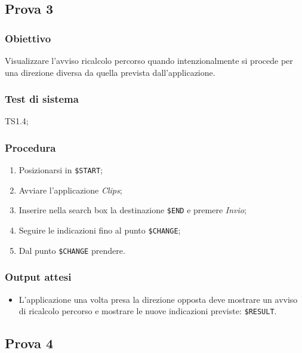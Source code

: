 \documentclass[../Sperimentazione.tex]{subfiles}
\begin{document}
	
	
\newpage
\subsection{Prova 3} %
\label{subsec:Prova3}
	
	\subsubsection{Obiettivo}
		Visualizzare l'avviso ricalcolo percorso quando intenzionalmente si procede per una direzione diversa da quella prevista dall'applicazione.
		
	\subsubsection{Test di sistema}
		TS1.4;
		
	\subsubsection{Procedura}
		\begin{enumerate}
		\item Posizionarsi in  \verb|$START|;
		\item Avviare l'applicazione \textit{Clips};
		\item Inserire nella search box la destinazione  \verb|$END| e premere \textit{Invio};
		\item Seguire le indicazioni fino al punto  \verb|$CHANGE|;
		\item Dal punto \verb|$CHANGE| prendere.
		\end{enumerate}
		
	\subsubsection{Output attesi}
		\begin{itemize}
		\item L'applicazione una volta presa la direzione opposta deve mostrare un avviso di ricalcolo percorso e mostrare le nuove indicazioni previste:  \verb|$RESULT|.
		\end{itemize}
		
	
	
\newpage		
\subsection{Prova 4} %
\label{subsec:Prova4}
	
\end{document}
